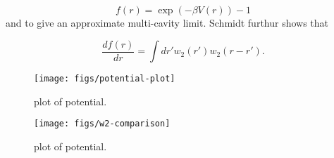 \documentclass[letterpaper,twocolumn,amsmath,amssymb,prb]{revtex4-1}
\begin{document}
\begin{equation}
f(r) = \exp (-\beta V(r)) - 1
\end{equation}
and to give an approximate multi-cavity limit. Schmidt furthur shows that\cite{schmidt2000fluid}

\begin{equation}\label{eq:mayerandw2}
\frac{d f(r)}{dr} = \int dr' w_2(r') w_2 (r-r').
\end{equation}

\begin{figure}
\begin{center}
\texttt{[image: figs/potential-plot]}
\end{center}
\caption{plot of potential.}
\label{fig:potential-plot}
\end{figure}

\begin{figure}
\begin{center}
\texttt{[image: figs/w2-comparison]}
\end{center}
\caption{plot of potential.}
\label{fig:w2-comparison}
\end{figure}
\end{document}
